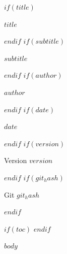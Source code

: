 \documentclass[$if(fontsize)$$fontsize$,$endif$$if(papersize)$$papersize$paper,$endif$article]{article}
\begin{document}
$if(title)$
{\LARGE\bfseries $title$\par}
$endif$
$if(subtitle)$
\vspace{0.5em}
{\large $subtitle$\par}
$endif$
\vspace{1em}
$if(author)$
{\normalsize $author$\par}
$endif$
$if(date)$
{\normalsize $date$\par}
$endif$
$if(version)$
{\small Version $version$\par}
$endif$
$if(git_hash)$
{\small Git $git_hash$\par}
$endif$
\vspace{1.5em}

$if(toc)$
\tableofcontents
\clearpage
$endif$

$body$
\end{document}
